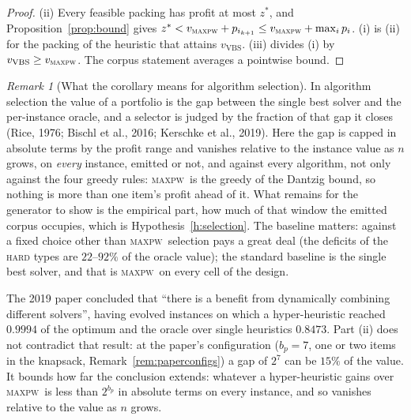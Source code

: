 \documentclass[a4paper,11pt]{article}
\newcommand{\bp}{b_{p}}
\newcommand{\MAXPW}{\textsc{maxpw}}
\theoremstyle{plain}
\theoremstyle{definition}
\theoremstyle{remark}
\newtheorem{remark}{Remark}
\begin{document}
\begin{proof}
(ii) Every feasible packing has profit at most $z^{*}$, and Proposition~\ref{prop:bound} gives
$z^{*}<v_{\MAXPW}+p_{i_{k+1}}\le v_{\MAXPW}+\max_ip_i$. (i) is (ii) for the packing of the
heuristic that attains $v_{\mathrm{VBS}}$. (iii) divides (i) by $v_{\mathrm{VBS}}\ge v_{\MAXPW}$.
The corpus statement averages a pointwise bound.
\end{proof}

\begin{remark}[What the corollary means for algorithm selection]
In algorithm selection the value of a portfolio is the gap between the single best solver
and the per-instance oracle, and a selector is judged by the fraction of that gap it closes
(Rice, 1976; Bischl et al., 2016; Kerschke et al., 2019). Here the gap is capped in absolute
terms by the profit range and vanishes relative to the instance value as $n$ grows, on
\emph{every} instance, emitted or not, and against every algorithm, not only against the
four greedy rules: \MAXPW\ is the greedy of the Dantzig bound, so nothing is more than one
item's profit ahead of it. What remains for the generator to show is the empirical part, how
much of that window the emitted corpus occupies, which is Hypothesis~\ref{h:selection}. The
baseline matters: against a fixed choice other than \MAXPW\ selection pays a great deal (the
deficits of the \textsc{hard} types are $22$--$92\%$ of the oracle value); the standard
baseline is the single best solver, and that is \MAXPW\ on every cell of the design.

The 2019 paper concluded that ``there is a benefit from dynamically combining different
solvers'', having evolved instances on which a hyper-heuristic reached $0.9994$ of the
optimum and the oracle over single heuristics $0.8473$. Part (ii) does not contradict that
result: at the paper's configuration ($\bp=7$, one or two items in the knapsack,
Remark~\ref{rem:paperconfigs}) a gap of $2^{7}$ can be $15\%$ of the value. It bounds how far
the conclusion extends: whatever a hyper-heuristic gains over \MAXPW\ is less than $2^{\bp}$
in absolute terms on every instance, and so vanishes relative to the value as $n$ grows.
\end{remark}
\end{document}
